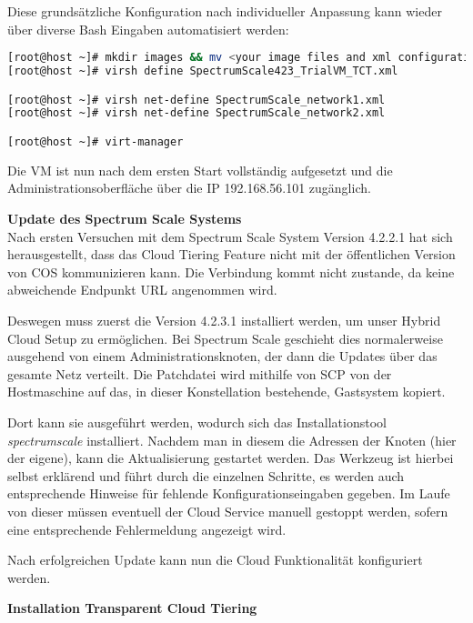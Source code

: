 Diese grundsätzliche Konfiguration nach individueller Anpassung kann wieder über diverse Bash Eingaben automatisiert werden: \\

\begin{lstlisting}[language=bash, caption=Portierung des VM Abbilds]
[root@host ~]# mkdir images && mv <your image files and xml configuration> images
[root@host ~]# virsh define SpectrumScale423_TrialVM_TCT.xml 

[root@host ~]# virsh net-define SpectrumScale_network1.xml
[root@host ~]# virsh net-define SpectrumScale_network2.xml

[root@host ~]# virt-manager
\end{lstlisting}

Die VM ist nun nach dem ersten Start vollständig aufgesetzt und die Administrationsoberfläche über die IP 192.168.56.101 zugänglich.

\textbf{Update des Spectrum Scale Systems}\\
Nach ersten Versuchen mit dem Spectrum Scale System Version 4.2.2.1 hat sich herausgestellt, dass das Cloud Tiering Feature nicht mit der öffentlichen Version von \acs{COS} kommunizieren kann. Die Verbindung kommt nicht zustande, da keine abweichende Endpunkt URL angenommen wird.

Deswegen muss zuerst die Version 4.2.3.1 installiert werden, um unser Hybrid Cloud Setup zu ermöglichen. Bei Spectrum Scale geschieht dies normalerweise ausgehend von einem Administrationsknoten, der dann die Updates über das gesamte Netz verteilt. Die Patchdatei wird mithilfe von \ac{SCP} von der Hostmaschine auf das, in dieser Konstellation bestehende, Gastsystem kopiert.	

Dort kann sie ausgeführt werden, wodurch sich das Installationstool \textit{spectrumscale} installiert. Nachdem man in diesem die Adressen der Knoten (hier der eigene), kann die Aktualisierung gestartet werden. Das Werkzeug ist hierbei selbst erklärend und führt durch die einzelnen Schritte, es werden auch entsprechende Hinweise für fehlende Konfigurationseingaben gegeben.
Im Laufe von dieser müssen eventuell der Cloud Service manuell gestoppt werden, sofern eine entsprechende Fehlermeldung angezeigt wird.

Nach erfolgreichen Update kann nun die Cloud Funktionalität konfiguriert werden.

\textbf{Installation Transparent Cloud Tiering}\\

